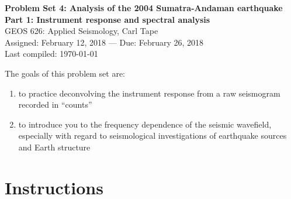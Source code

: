 \documentclass[11pt,titlepage,fleqn]{article}
\begin{document}

\begin{spacing}{1.2}
\centering
{\large \bf Problem Set 4: Analysis of the 2004 Sumatra-Andaman earthquake \\
Part 1: Instrument response and spectral analysis \\ }
GEOS 626: Applied Seismology, Carl Tape \\
Assigned: February 12, 2018 --- Due: February 26, 2018 \\
Last compiled: \today
\end{spacing}


\bigskip
\noindent
The goals of this problem set are:
%
\begin{enumerate}
\item to practice deconvolving the instrument response from a raw seismogram recorded in ``counts''
\item to introduce you to the frequency dependence of the seismic wavefield, especially with regard to seismological investigations of earthquake sources and Earth structure
\end{enumerate}

\section*{Instructions}
\end{document}
